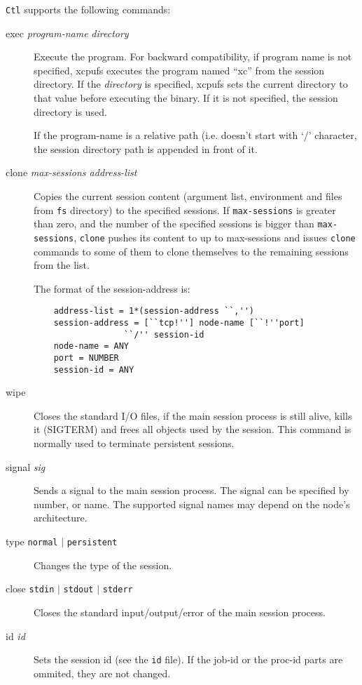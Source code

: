 \documentclass[draft]{article}
\begin{document}
\verb|Ctl| supports the following commands:

\begin{description}

\item[exec {\sl program-name} {\sl directory} ] Execute the program. For
backward compatibility, if program name is not specified, xcpufs executes
the program named ``xc'' from the session directory. If the {\sl directory}
is specified, xcpufs sets the current directory to that value before
executing the binary. If it is not specified, the session directory is used.

If the program-name is a relative path (i.e. doesn't start with `/'
character, the session directory path is appended in front of it.

\item[clone {\sl max-sessions address-list}] Copies the current session content
(argument list, environment and files from \verb|fs| directory) to the
specified sessions. If \verb|max-sessions| is greater than zero, and the
number of the specified sessions is bigger than \verb|max-sessions|,
\verb|clone| pushes its content to up to max-sessions and issues
\verb|clone| commands to some of them to clone themselves to the remaining
sessions from the list.

The format of the session-address is:

\begin{verbatim}
	address-list = 1*(session-address ``,'')
	session-address = [``tcp!''] node-name [``!''port] 
		          ``/'' session-id
	node-name = ANY
	port = NUMBER
	session-id = ANY
\end{verbatim}

\item [wipe] Closes the standard I/O files, if the main session process is
still alive, kills it (SIGTERM) and frees all objects used by the session.
This command is normally used to terminate persistent sessions. 

\item [signal {\sl sig}] Sends a signal to the main session process. The
signal can be specified by number, or name. The supported signal names may
depend on the node's architecture.

\item [type {\tt normal} $|$ {\tt persistent}] Changes the type of the session.

\item [close {\tt stdin} $|$ {\tt stdout} $|$ {\tt stderr}] Closes the
standard input/output/error of the main session process.

\item [id {\sl id}] Sets the session id (see the \verb|id| file). If the
job-id or the proc-id parts are ommited, they are not changed.

\end{description}
\end{document}

